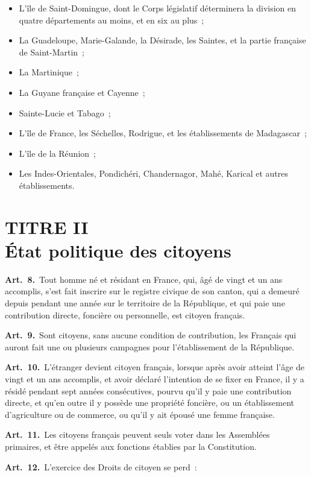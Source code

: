 \documentclass[french,twoside]{book} %
\newcommand{\labelchar}[1]{\textbf{\color{rubric} #1}}
\begin{document}
\begin{itemize}[itemsep=0pt,topsep=0pt,partopsep=0pt,parskip=0pt]
\item L’île de Saint-Domingue, dont le Corps législatif déterminera la division en quatre départements au moins, et en six au plus ;
\item La Guadeloupe, Marie-Galande, la Désirade, les Saintes, et la partie française de Saint-Martin ;
\item La Martinique ;
\item La Guyane française et Cayenne ;
\item Sainte-Lucie et Tabago ;
\item L’île de France, les Séchelles, Rodrigue, et les établissements de Madagascar ;
\item L’île de la Réunion ;
\item Les Indes-Orientales, Pondichéri, Chandernagor, Mahé, Karical et autres établissements.
\end{itemize}


\section[{TITRE II. État politique des citoyens}]{TITRE II \\
État politique des citoyens}

\labelchar{Art. 8.} Tout homme né et résidant en France, qui, âgé de vingt et un ans accomplis, s’est fait inscrire sur le registre civique de son canton, qui a demeuré depuis pendant une année sur le territoire de la République, et qui paie une contribution directe, foncière ou personnelle, est citoyen français.\par
\labelchar{Art. 9.} Sont citoyens, sans aucune condition de contribution, les Français qui auront fait une ou plusieurs campagnes pour l’établissement de la République.\par
\labelchar{Art. 10.} L’étranger devient citoyen français, lorsque après avoir atteint l’âge de vingt et un ans accomplis, et avoir déclaré l’intention de se fixer en France, il y a résidé pendant sept années consécutives, pourvu qu’il y paie une contribution directe, et qu’en outre il y possède une propriété foncière, ou un établissement d’agriculture ou de commerce, ou qu’il y ait épousé une femme française.\par
\labelchar{Art. 11.} Les citoyens français peuvent seuls voter dans les Assemblées primaires, et être appelés aux fonctions établies par la Constitution.\par
\labelchar{Art. 12.} L’exercice des Droits de citoyen se perd :\par
\end{document}
